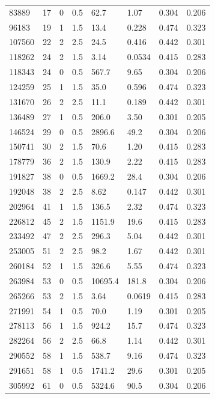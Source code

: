 \documentclass[preview]{standalone}
\begin{document}
{{\begin{tabular}{L{1.2cm}C{1.2cm} C{0.3cm}C{0.5cm} C{1.4cm}C{1.4cm} C{1.4cm}C{1.4cm}}
  83889  &    17  & 0     & 0.5 &  62.7  & 1.07  & 0.304 &  0.206   \\ 
  96183  &    19  & 1     & 1.5 &  13.4  & 0.228  & 0.474 &  0.323   \\ 
  107560  &    22  & 2     & 2.5 &  24.5  & 0.416  & 0.442 &  0.301   \\ 
  118262  &    24  & 2     & 1.5 &  3.14  & 0.0534  & 0.415 &  0.283   \\ 
  118343  &    24  & 0     & 0.5 &  567.7  & 9.65  & 0.304 &  0.206   \\ 
  124259  &    25  & 1     & 1.5 &  35.0  & 0.596  & 0.474 &  0.323   \\ 
  131670  &    26  & 2     & 2.5 &  11.1  & 0.189  & 0.442 &  0.301   \\ 
  136489  &    27  & 1     & 0.5 &  206.0  & 3.50  & 0.301 &  0.205   \\ 
  146524  &    29  & 0     & 0.5 &  2896.6  & 49.2  & 0.304 &  0.206   \\ 
  150741  &    30  & 2     & 1.5 &  70.6  & 1.20  & 0.415 &  0.283   \\ 
  178779  &    36  & 2     & 1.5 &  130.9  & 2.22  & 0.415 &  0.283   \\ 
  191827  &    38  & 0     & 0.5 &  1669.2  & 28.4  & 0.304 &  0.206   \\ 
  192048  &    38  & 2     & 2.5 &  8.62  & 0.147  & 0.442 &  0.301   \\ 
  202964  &    41  & 1     & 1.5 &  136.5  & 2.32  & 0.474 &  0.323   \\ 
  226812  &    45  & 2     & 1.5 &  1151.9  & 19.6  & 0.415 &  0.283   \\ 
  233492  &    47  & 2     & 2.5 &  296.3  & 5.04  & 0.442 &  0.301   \\ 
  253005  &    51  & 2     & 2.5 &  98.2  & 1.67  & 0.442 &  0.301   \\ 
  260184  &    52  & 1     & 1.5 &  326.6  & 5.55  & 0.474 &  0.323   \\ 
  263984  &    53  & 0     & 0.5 &  10695.4  & 181.8  & 0.304 &  0.206   \\ 
  265266  &    53  & 2     & 1.5 &  3.64  & 0.0619  & 0.415 &  0.283   \\ 
  271991  &    54  & 1     & 0.5 &  70.0  & 1.19  & 0.301 &  0.205   \\ 
  278113  &    56  & 1     & 1.5 &  924.2  & 15.7  & 0.474 &  0.323   \\ 
  282264  &    56  & 2     & 2.5 &  66.8  & 1.14  & 0.442 &  0.301   \\ 
  290552  &    58  & 1     & 1.5 &  538.7  & 9.16  & 0.474 &  0.323   \\ 
  291651  &    58  & 1     & 0.5 &  1741.2  & 29.6  & 0.301 &  0.205   \\ 
  305992  &    61  & 0     & 0.5 &  5324.6  & 90.5  & 0.304 &  0.206   \\ 
\hline 
\end{tabular} 

}}
\end{document}
